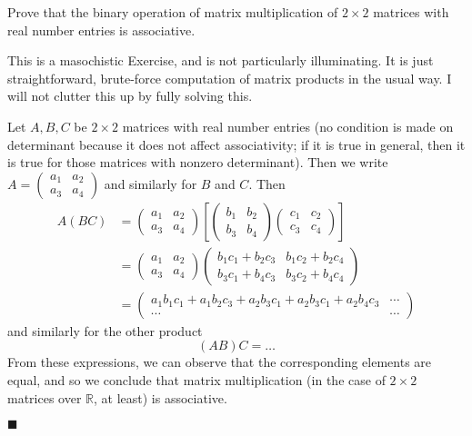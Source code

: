 \documentclass[12pt]{article}
\renewcommand{\qed}{\hfill$\blacksquare$}
\renewenvironment{proof}{\begin{addmargin}[1em]{0em}\begin{newproof}}{\end{newproof}\end{addmargin}\qed}
\newenvironment{problem}[2][Exercise]{\begin{trivlist}
\item[\hskip \labelsep {\bfseries #1}\hskip \labelsep {\bfseries #2.}]}{\end{trivlist}}
\begin{document}
\begin{problem}{1.4.9}
Prove that the binary operation of matrix multiplication of $2\times 2$ matrices with real number entries is associative.
\end{problem}
This is a masochistic Exercise, and is not particularly illuminating. It is just straightforward, brute-force computation of matrix products in the usual way. I will not clutter this up by fully solving this. \\
\begin{proof}
Let $A,B,C$ be $2\times 2$ matrices with real number entries (no condition is made on determinant because it does not affect associativity; if it is true in general, then it is true for those matrices with nonzero determinant). Then we write $A=\left(\begin{array}{cc}a_1 & a_2 \\ a_3 & a_4 \end{array}\right)$ and similarly for $B$ and $C$. Then
\begin{equation*}
    \begin{split}
        A\left(BC\right) & = \left(\begin{array}{cc} a_1 & a_2 \\ a_3 & a_4 \end{array}\right) \left[ \left(\begin{array}{cc} b_1 & b_2 \\ b_3 & b_4 \end{array}\right)\left(\begin{array}{cc} c_1 & c_2 \\ c_3 & c_4 \end{array}\right)\right] \\ &  = \left(\begin{array}{cc} a_1 & a_2 \\ a_3 & a_4 \end{array}\right) \left(\begin{array}{cc} b_1c_1+b_2c_3 & b_1c_2+b_2c_4 \\ b_3c_1+b_4c_3 & b_3c_2+b_4c_4\end{array}\right) \\
        & = \left(\begin{array}{cc} a_1b_1c_1+a_1b_2c_3+a_2b_3c_1+a_2b_3c_1+a_2b_4c_3 & \cdots \\ \cdots & \cdots \end{array}\right)
    \end{split}
\end{equation*}
and similarly for the other product
$$ \left(AB\right)C = \ldots $$
From these expressions, we can observe that the corresponding elements are equal, and so we conclude that matrix multiplication (in the case of $2\times 2$ matrices over $\mathbb{R}$, at least) is associative.
\end{proof}
\end{document}
